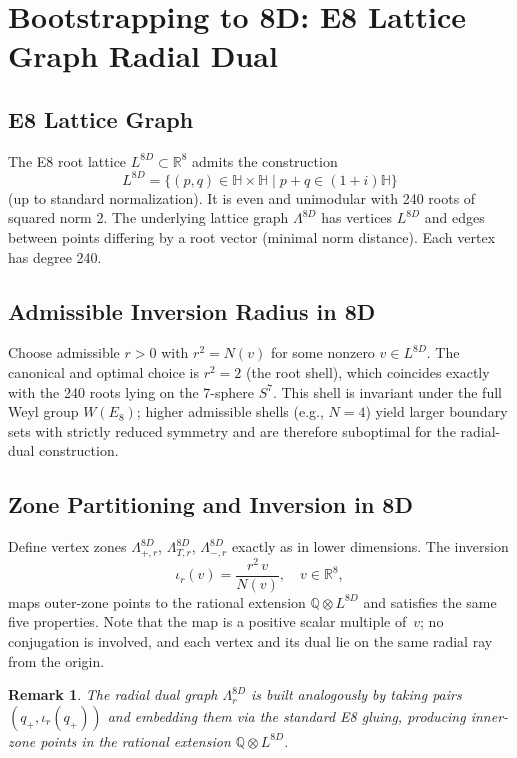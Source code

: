 \documentclass{article}
\newtheorem{remark}{Remark}
\begin{document}
\section{Bootstrapping to 8D: E8 Lattice Graph Radial Dual}
\label{sec:bootstrapping-8d}
\subsection{E8 Lattice Graph}
The E8 root lattice \(L^{8D} \subset \mathbb{R}^8\) admits the construction
\[
L^{8D} = \{ (p, q) \in \mathbb{H} \times \mathbb{H} \mid p + q \in (1+i)\mathbb{H} \}
\]
(up to standard normalization). It is even and unimodular with 240 roots of squared norm 2.\cite{ConwaySloane1999} The underlying lattice graph \(\Lambda^{8D}\) has vertices \(L^{8D}\) and edges between points differing by a root vector (minimal norm distance). Each vertex has degree 240.
\subsection{Admissible Inversion Radius in 8D}
Choose admissible \(r > 0\) with \(r^2 = N(v)\) for some nonzero \(v \in L^{8D}\). The canonical and optimal choice is \(r^2 = 2\) (the root shell), which coincides exactly with the 240 roots lying on the 7-sphere \(S^7\). This shell is invariant under the full Weyl group \(W(E_8)\); higher admissible shells (e.g., \(N=4\)) yield larger boundary sets with strictly reduced symmetry and are therefore suboptimal for the radial-dual construction.
\subsection{Zone Partitioning and Inversion in 8D}
Define vertex zones \(\Lambda_{+,r}^{8D}\), \(\Lambda_{T,r}^{8D}\), \(\Lambda_{-,r}^{8D}\) exactly as in lower dimensions. The inversion
\[
\iota_r(v) = \frac{r^2 \, v}{N(v)}, \quad v \in \mathbb{R}^8,
\]
maps outer-zone points to the rational extension \(\mathbb{Q} \otimes L^{8D}\) and satisfies the same five properties. Note that the map is a positive scalar multiple of~\(v\); no conjugation is involved, and each vertex and its dual lie on the same radial ray from the origin.
\begin{remark}
The radial dual graph \(\Lambda_r^{8D}\) is built analogously by taking pairs \((q_+, \iota_r(q_+))\) and embedding them via the standard E8 gluing, producing inner-zone points in the rational extension \(\mathbb{Q} \otimes L^{8D}\).
\end{remark}
\end{document}
